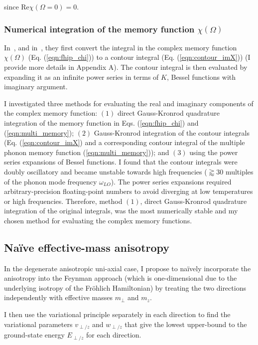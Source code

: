 since $\textrm{Re}\chi(\Omega = 0) = 0$.

\subsubsection{Numerical integration of the memory function $\chi(\Omega)$}

In~\cite{feynman_mobility_1962}, and in~\cite{devreese_optical_1972}, they first convert the integral in the complex memory function $\chi(\Omega)$ (Eq. (\ref{eqn:fhip_chi})) to a contour integral (Eq. (\ref{eqn:contour_imX})) (I provide more details in Appendix A). The contour integral is then evaluated by expanding it as an infinite power series in terms of $K$, Bessel functions with imaginary argument. 

I investigated three methods for evaluating the real and imaginary components of the complex memory function: $(1)$ direct Gauss-Kronrod quadrature integration of the memory function in Eqs. (\ref{eqn:fhip_chi}) and (\ref{eqn:multi_memory}); $(2)$ Gauss-Kronrod integration of the contour integrals (Eq. (\ref{eqn:contour_imX}) and a corresponding contour integral of the multiple phonon memory function (\ref{eqn:multi_memory})); and $(3)$ using the power series expansions of Bessel functions. I found that the contour integrals were doubly oscillatory and became unstable towards high frequencies ($\gtrapprox 30$ multiples of the phonon mode frequency $\omega_{LO}$). The power series expansions required arbitrary-precision floating-point numbers to avoid diverging at low temperatures or high frequencies. Therefore, method $(1)$, direct Gauss-Kronrod quadrature integration of the original integrals, was the most numerically stable and my chosen method for evaluating the complex memory functions.

\subsection{Na\"ive effective-mass anisotropy}

In the degenerate anisotropic uni-axial case, I propose to na\"ively incorporate the anisotropy into the Feynman approach (which is one-dimensional due to the underlying isotropy of the Fr\"ohlich Hamiltonian) by treating the two directions independently with effective masses $m_\perp$ and $m_z$.

I then use the variational principle separately in each direction to find the variational parameters $v_{\perp/z}$ and $w_{\perp/z}$ that give the lowest upper-bound to the ground-state energy $E_{\perp/z}$ for each direction. 

